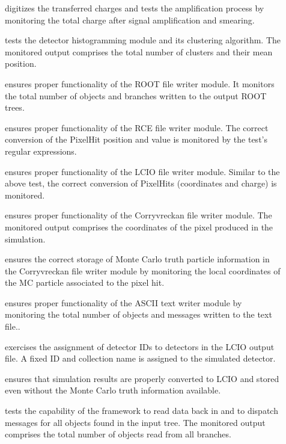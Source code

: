 \begin{description}
    \item[] digitizes the transferred charges and tests the amplification process by monitoring the total charge after signal amplification and smearing.
    \item[] tests the detector histogramming module and its clustering algorithm. The monitored output comprises the total number of clusters and their mean position.
    \item[] ensures proper functionality of the ROOT file writer module. It monitors the total number of objects and branches written to the output ROOT trees.
    \item[] ensures proper functionality of the RCE file writer module. The correct conversion of the PixelHit position and value is monitored by the test's regular expressions.
    \item[] ensures proper functionality of the LCIO file writer module. Similar to the above test, the correct conversion of PixelHits (coordinates and charge) is monitored.
    \item[] ensures proper functionality of the Corryvreckan file writer module. The monitored output comprises the coordinates of the pixel produced in the simulation.
    \item[] ensures the correct storage of Monte Carlo truth particle information in the Corryvreckan file writer module by monitoring the local coordinates of the MC particle associated to the pixel hit.
    \item[] ensures proper functionality of the ASCII text writer module by monitoring the total number of objects and messages written to the text file..
    \item[] exercises the assignment of detector IDs to \apsq detectors in the LCIO output file. A fixed ID and collection name is assigned to the simulated detector.
    \item[] ensures that simulation results are properly converted to LCIO and stored even without the Monte Carlo truth information available.
    \item[] tests the capability of the framework to read data back in and to dispatch messages for all objects found in the input tree. The monitored output comprises the total number of objects read from all branches.

\end{description}
